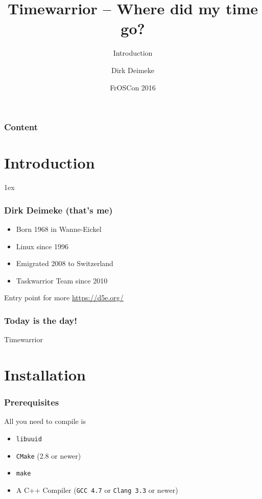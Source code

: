 \documentclass[t,handout]{beamer}
\title{Timewarrior -- Where did my time go?}
\subtitle{Introduction}
\author[Deimeke, Dirk]{Dirk Deimeke}
\institute[Taskwarrior academy]{Taskwarrior academy}
\date{FrOSCon 2016}
\begin{document}
\begin{frame} %
	\titlepage
\end{frame}


\begin{frame}\frametitle{Content}
	\tableofcontents
\end{frame}

\section{Introduction}

\parskip1ex

\begin{frame}[fragile]\frametitle{Dirk Deimeke (that's me)}
    \begin{itemize}
        \item Born 1968 in Wanne-Eickel
        \item Linux since 1996
        \item Emigrated 2008 to Switzerland
        \item Taskwarrior Team since 2010
    \end{itemize}

    Entry point for more \url{https://d5e.org/}
\end{frame}

\begin{frame}[fragile]\frametitle{Today is the day!}
    Timewarrior
\end{frame}

\section{Installation}

\begin{frame}[fragile]\frametitle{Prerequisites}
    All you need to compile is
    \begin{itemize}
        \item \verb+libuuid+
        \item \verb+CMake+ (2.8 or newer)
        \item \verb+make+
        \item A C++ Compiler (\verb+GCC 4.7+ or \verb+Clang 3.3+ or newer)
    \end{itemize}
\end{frame}
\end{document}

